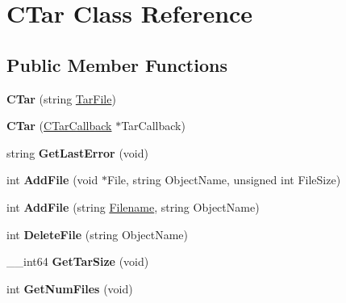 \hypertarget{class_c_tar}{
\section{CTar Class Reference}
\label{class_c_tar}
}
\subsection*{Public Member Functions}
\begin{DoxyCompactItemize}
\item 
\hypertarget{class_c_tar_af488e71eb35ff1884427fe2bf5cdb281}{
{\bfseries CTar} (string \hyperlink{struct_tar_file}{TarFile})}
\label{class_c_tar_af488e71eb35ff1884427fe2bf5cdb281}

\item 
\hypertarget{class_c_tar_a2f10d4d57528e42bfda76f16f4bcef4d}{
{\bfseries CTar} (\hyperlink{class_c_tar_callback}{CTarCallback} $\ast$TarCallback)}
\label{class_c_tar_a2f10d4d57528e42bfda76f16f4bcef4d}

\item 
\hypertarget{class_c_tar_a019f18df37a290a89dfe4541250bfdde}{
string {\bfseries GetLastError} (void)}
\label{class_c_tar_a019f18df37a290a89dfe4541250bfdde}

\item 
\hypertarget{class_c_tar_a96f0fbba6502e35e47c4610d0cbf31b2}{
int {\bfseries AddFile} (void $\ast$File, string ObjectName, unsigned int FileSize)}
\label{class_c_tar_a96f0fbba6502e35e47c4610d0cbf31b2}

\item 
\hypertarget{class_c_tar_a677c39780f32a6b41cb8164c7b57a07a}{
int {\bfseries AddFile} (string \hyperlink{struct_filename}{Filename}, string ObjectName)}
\label{class_c_tar_a677c39780f32a6b41cb8164c7b57a07a}

\item 
\hypertarget{class_c_tar_a54c3783d371dc78546029996223e7805}{
int {\bfseries DeleteFile} (string ObjectName)}
\label{class_c_tar_a54c3783d371dc78546029996223e7805}

\item 
\hypertarget{class_c_tar_adfdf0617e7403e40fff89e4ee41bee0c}{
\_\-\_\-int64 {\bfseries GetTarSize} (void)}
\label{class_c_tar_adfdf0617e7403e40fff89e4ee41bee0c}

\item 
\hypertarget{class_c_tar_adea70d2616c95fca3064d11149d4f909}{
int {\bfseries GetNumFiles} (void)}
\label{class_c_tar_adea70d2616c95fca3064d11149d4f909}


\end{DoxyCompactItemize}
